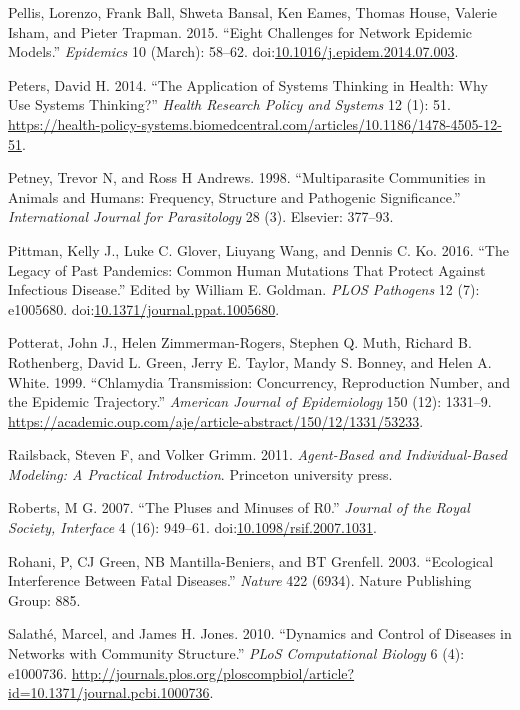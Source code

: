 \documentclass[]{book}
\theoremstyle{definition}
\theoremstyle{definition}
\theoremstyle{definition}
\theoremstyle{remark}
\begin{document}
\hypertarget{ref-pellis15}{}
Pellis, Lorenzo, Frank Ball, Shweta Bansal, Ken Eames, Thomas House,
Valerie Isham, and Pieter Trapman. 2015. ``Eight Challenges for Network
Epidemic Models.'' \emph{Epidemics} 10 (March): 58--62.
doi:\href{https://doi.org/10.1016/j.epidem.2014.07.003}{10.1016/j.epidem.2014.07.003}.

\hypertarget{ref-peters14}{}
Peters, David H. 2014. ``The Application of Systems Thinking in Health:
Why Use Systems Thinking?'' \emph{Health Research Policy and Systems} 12
(1): 51.
\url{https://health-policy-systems.biomedcentral.com/articles/10.1186/1478-4505-12-51}.

\hypertarget{ref-petney98}{}
Petney, Trevor N, and Ross H Andrews. 1998. ``Multiparasite Communities
in Animals and Humans: Frequency, Structure and Pathogenic
Significance.'' \emph{International Journal for Parasitology} 28 (3).
Elsevier: 377--93.

\hypertarget{ref-pittman16}{}
Pittman, Kelly J., Luke C. Glover, Liuyang Wang, and Dennis C. Ko. 2016.
``The Legacy of Past Pandemics: Common Human Mutations That Protect
Against Infectious Disease.'' Edited by William E. Goldman. \emph{PLOS
Pathogens} 12 (7): e1005680.
doi:\href{https://doi.org/10.1371/journal.ppat.1005680}{10.1371/journal.ppat.1005680}.

\hypertarget{ref-potterat99}{}
Potterat, John J., Helen Zimmerman-Rogers, Stephen Q. Muth, Richard B.
Rothenberg, David L. Green, Jerry E. Taylor, Mandy S. Bonney, and Helen
A. White. 1999. ``Chlamydia Transmission: Concurrency, Reproduction
Number, and the Epidemic Trajectory.'' \emph{American Journal of
Epidemiology} 150 (12): 1331--9.
\url{https://academic.oup.com/aje/article-abstract/150/12/1331/53233}.

\hypertarget{ref-railsback11}{}
Railsback, Steven F, and Volker Grimm. 2011. \emph{Agent-Based and
Individual-Based Modeling: A Practical Introduction}. Princeton
university press.

\hypertarget{ref-roberts07}{}
Roberts, M G. 2007. ``The Pluses and Minuses of R0.'' \emph{Journal of
the Royal Society, Interface} 4 (16): 949--61.
doi:\href{https://doi.org/10.1098/rsif.2007.1031}{10.1098/rsif.2007.1031}.

\hypertarget{ref-rohani03}{}
Rohani, P, CJ Green, NB Mantilla-Beniers, and BT Grenfell. 2003.
``Ecological Interference Between Fatal Diseases.'' \emph{Nature} 422
(6934). Nature Publishing Group: 885.

\hypertarget{ref-salathe10}{}
Salathé, Marcel, and James H. Jones. 2010. ``Dynamics and Control of
Diseases in Networks with Community Structure.'' \emph{PLoS
Computational Biology} 6 (4): e1000736.
\url{http://journals.plos.org/ploscompbiol/article?id=10.1371/journal.pcbi.1000736}.
\end{document}
